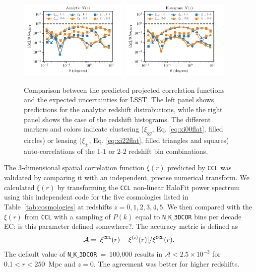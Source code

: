 \documentclass[\docopts]{\docclass}
\newcommand{\elisa}[1]{\textcolor{green!10!orange!90!}{EC: #1}}
\newcommand{\ccl}{{\tt CCL}\xspace}
\begin{document}
\begin{figure}
\centering
\includegraphics[width=0.47\textwidth]{projected_correlation_error_comparison_analytic} 
\includegraphics[width=0.47\textwidth]{projected_correlation_error_comparison_histo} 
\caption{Comparison between the predicted projected correlation functions and the expected uncertainties for LSST. The left panel shows predictions for the analytic redshift distrobutions, while the right panel shows the case of the redshift histograms. The different markers and colors indicate clustering ($\xi_{gg}$, Eq. \ref{eq:xi00flat}, filled circles) or lensing ($\xi_{\pm}$, Eq. \ref{eq:xi22flat}, filled triangles and squares) auto-correlations of the $1$-$1$ or $2$-$2$ redshift bin combinations.}
\label{fig:corrval}
\end{figure}

  
The 3-dimensional spatial correlation function $\xi(r)$ predicted by \ccl was validated by comparing it with an independent, precise numerical transform. We calculated $\xi(r)$  by transforming the \ccl non-linear HaloFit power spectrum using this independent code for the five cosmologies listed in Table~\ref{tab:cosmologies} at redshifts $z = 0,1,2,3,4,5$.  We then compared with the $\xi(r)$ from \ccl with a sampling of $P(k)$ equal to {\tt N$\_$K$\_$3DCOR} bins per decade \elisa{is this parameter defined somewhere?}. The accuracy metric is defined as
\begin{equation}
  \mathcal{A}=|\xi^{\tt CCL}(r)-\xi^{(i)}(r)| / \xi^{\tt CCL}(r).
  \label{eq:accxi}
\end{equation}
The default value of {\tt N$\_$K$\_$3DCOR}~=~100,000 results in $\mathcal{A} < 2.5 \times 10^{-3}$ for $0.1 < r < 250$~Mpc and $z=0$. The agreement was better for higher redshifts.
\end{document}
